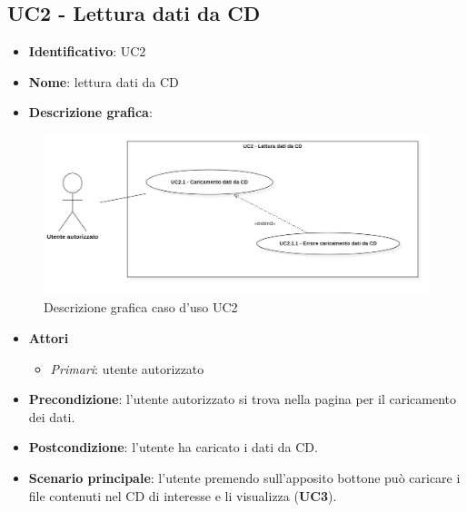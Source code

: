 
\subsection{UC2 - Lettura dati da CD}
\begin{itemize}
  \item \textbf{Identificativo}: UC2
  \item \textbf{Nome}: lettura dati da CD
  \item \textbf{Descrizione grafica}:
\end{itemize}

\begin{figure}[H]
  \centering
  \includegraphics[width=\textwidth]{immagini/usecase/UC2.png}
  \caption{Descrizione grafica caso d'uso UC2}
\end{figure}

\begin{itemize}
  \item \textbf{Attori}
        \begin{itemize}
          \item \textit{Primari}: utente autorizzato
        \end{itemize}
  \item \textbf{Precondizione}: l'utente autorizzato si trova nella pagina per il caricamento dei dati.
  \item \textbf{Postcondizione}: l'utente ha caricato i dati da CD.
  \item \textbf{Scenario principale}: l'utente premendo sull'apposito bottone può caricare i file contenuti nel CD di interesse e li visualizza (\textbf{UC3}).
\end{itemize}

